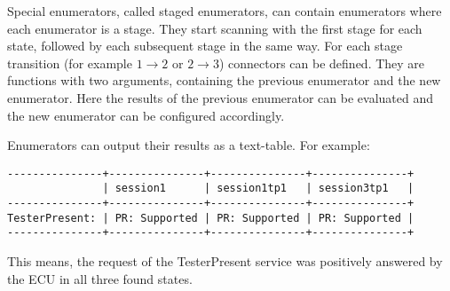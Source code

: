 Special enumerators, called staged enumerators, can contain enumerators where each enumerator is a stage. They start scanning with the first stage for each state, followed by each subsequent stage in the same way. For each stage transition (for example $1 \rightarrow 2$ or $2 \rightarrow 3$) connectors can be defined. They are functions with two arguments, containing the previous enumerator and the new enumerator. Here the results of the previous enumerator can be evaluated and the new enumerator can be configured accordingly.

Enumerators can output their results as a text-table. For example:

\begin{samepage}
\begin{verbatim}
---------------+---------------+---------------+---------------+
               | session1      | session1tp1   | session3tp1   | 
---------------+---------------+---------------+---------------+
TesterPresent: | PR: Supported | PR: Supported | PR: Supported | 
---------------+---------------+---------------+---------------+
\end{verbatim}
\end{samepage}

This means, the request of the TesterPresent service was positively answered by the ECU in all three found states.
